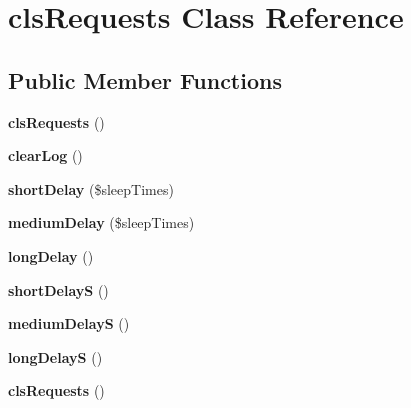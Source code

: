 \hypertarget{classclsRequests}{
\section{clsRequests Class Reference}
\label{classclsRequests}
}
\subsection*{Public Member Functions}
\begin{DoxyCompactItemize}
\item 
\hypertarget{classclsRequests_abf00e5456c1624acca683a3f1584bd13}{
{\bfseries clsRequests} ()}
\label{classclsRequests_abf00e5456c1624acca683a3f1584bd13}

\item 
\hypertarget{classclsRequests_a9b517bdeb746d53e9567928b037f5dd0}{
{\bfseries clearLog} ()}
\label{classclsRequests_a9b517bdeb746d53e9567928b037f5dd0}

\item 
\hypertarget{classclsRequests_a6720963b04c8d0e9e00a427a7b3bcf33}{
{\bfseries shortDelay} (\$sleepTimes)}
\label{classclsRequests_a6720963b04c8d0e9e00a427a7b3bcf33}

\item 
\hypertarget{classclsRequests_ae0be0247b54a46bc726e27d59b0e31ad}{
{\bfseries mediumDelay} (\$sleepTimes)}
\label{classclsRequests_ae0be0247b54a46bc726e27d59b0e31ad}

\item 
\hypertarget{classclsRequests_a00e91c2cd430ad3cfbb4c5f7deb129d8}{
{\bfseries longDelay} ()}
\label{classclsRequests_a00e91c2cd430ad3cfbb4c5f7deb129d8}

\item 
\hypertarget{classclsRequests_a9b6374f3890ed20cb6fa703dc880c118}{
{\bfseries shortDelayS} ()}
\label{classclsRequests_a9b6374f3890ed20cb6fa703dc880c118}

\item 
\hypertarget{classclsRequests_ad721ac678548e8183e719d4b2fc8b53a}{
{\bfseries mediumDelayS} ()}
\label{classclsRequests_ad721ac678548e8183e719d4b2fc8b53a}

\item 
\hypertarget{classclsRequests_a119a98f418f09aa2add72503a4a21afe}{
{\bfseries longDelayS} ()}
\label{classclsRequests_a119a98f418f09aa2add72503a4a21afe}

\item 
\hypertarget{classclsRequests_abf00e5456c1624acca683a3f1584bd13}{
{\bfseries clsRequests} ()}
\label{classclsRequests_abf00e5456c1624acca683a3f1584bd13}


\end{DoxyCompactItemize}
